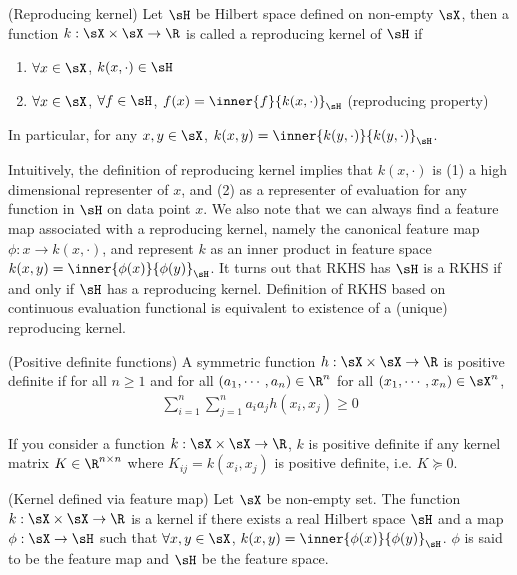 \documentclass[11pt]{article}
\begin{document}
\begin{definition}
    (Reproducing kernel) Let $\sH$ be Hilbert space defined on non-empty $\sX$, then a function $k:\sX\times\sX\to\R$ is called a reproducing kernel of $\sH$ if
    \begin{enumerate}
        \item $\forall x\in\sX$, $k(x,\cdot)\in\sH$ 
        \item $\forall x\in\sX$, $\forall f\in\sH$, $f(x) = \inner{f}{k(x,\cdot)}_{\sH}$ (reproducing property)
    \end{enumerate}
    In particular, for any $x,y\in\sX$, $k(x,y) = \inner{k(y,\cdot)}{k(y,\cdot)}_{\sH}$.
\end{definition}

Intuitively, the definition of reproducing kernel implies that $k(x,\cdot)$ is (1) a high dimensional representer of $x$, and (2) as a representer of evaluation for any function in $\sH$ on data point $x$. We also note that we can always find a feature map associated with a reproducing kernel, namely the canonical feature map $\phi:x\to k(x,\cdot)$, and represent $k$ as an inner product in feature space $k(x,y) = \inner{\phi(x)}{\phi(y)}_{\sH}$. It turns out that RKHS has $\sH$ is a RKHS if and only if $\sH$ has a reproducing kernel. Definition of RKHS based on continuous evaluation functional is equivalent to existence of a (unique) reproducing kernel. 

\begin{definition}
    (Positive definite functions) A symmetric function $h:\sX\times\sX\to\R$ is positive definite if for all $n\geq 1$ and for all $(a_1,\cdots,a_n)\in\R^n$ for all $(x_1,\cdots,x_n)\in\sX^n$, 
    \begin{align}
        \sum_{i=1}^n \sum_{j=1}^n a_i a_j h(x_i,x_j) \geq 0
    \end{align}
\end{definition}
If you consider a function $k:\sX\times\sX\to\R$, $k$ is positive definite if any kernel matrix $K\in\R^{n\times n}$ where $K_{ij}=k(x_i,x_j)$ is positive definite, i.e. $K\succeq 0$. 

\begin{definition}
    (Kernel defined via feature map) Let $\sX$ be non-empty set. The function $k:\sX\times\sX\to\R$ is a kernel if there exists a real Hilbert space $\sH$ and a map $\phi:\sX\to\sH$ such that $\forall x,y\in\sX$, $k(x,y)=\inner{\phi(x)}{\phi(y)}_{\sH}$. $\phi$ is said to be the feature map and $\sH$  be the feature space.
\end{definition}
\end{document}
